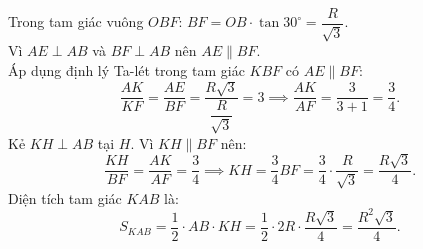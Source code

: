\begin{bt}
{\begin{enumerate}[a)]
    Trong tam giác vuông $OBF$: $BF = OB \cdot \tan 30^\circ = \dfrac{R}{\sqrt{3}}$.\\
    Vì $AE \perp AB$ và $BF \perp AB$ nên $AE \parallel BF$.\\
    Áp dụng định lý Ta-lét trong tam giác $KBF$ có $AE \parallel BF$:
    $$\dfrac{AK}{KF} = \dfrac{AE}{BF} = \dfrac{R\sqrt{3}}{\dfrac{R}{\sqrt{3}}} = 3 \implies \dfrac{AK}{AF} = \dfrac{3}{3 + 1} = \dfrac{3}{4}.$$
    Kẻ $KH \perp AB$ tại $H$. Vì $KH \parallel BF$ nên:
    $$\dfrac{KH}{BF} = \dfrac{AK}{AF} = \dfrac{3}{4} \implies KH = \dfrac{3}{4}BF = \dfrac{3}{4} \cdot \dfrac{R}{\sqrt{3}} = \dfrac{R\sqrt{3}}{4}.$$
    Diện tích tam giác $KAB$ là:
    $$S_{KAB} = \dfrac{1}{2} \cdot AB \cdot KH = \dfrac{1}{2} \cdot 2R \cdot \dfrac{R\sqrt{3}}{4} = \dfrac{R^2\sqrt{3}}{4}.$$
\end{enumerate}
}
\end{bt}

